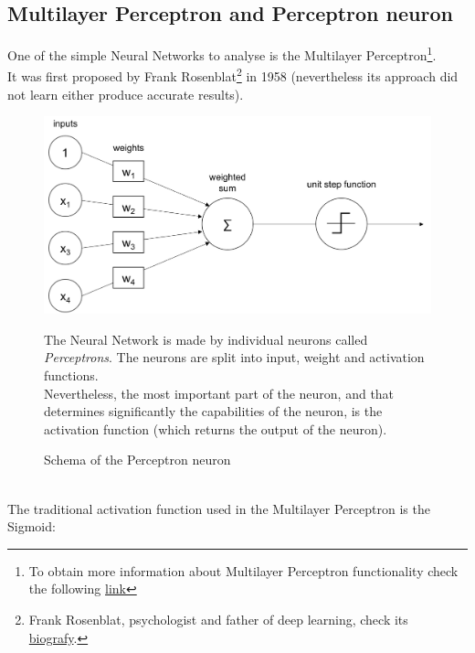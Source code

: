 \documentclass[a4paper, 11pt]{article}
\begin{document}
\subsection{Multilayer Perceptron and Perceptron neuron}
One of the simple Neural Networks to analyse is the Multilayer Perceptron\footnote{To obtain more information about Multilayer Perceptron functionality check the following \href{https://en.wikipedia.org/wiki/Multilayer_perceptron}{link}}.\\
It was first proposed by Frank Rosenblat\footnote{Frank Rosenblat, psychologist and father of deep learning, check its \href{https://en.wikipedia.org/wiki/Frank_Rosenblat}{biografy}.} in 1958 (nevertheless its approach did not learn either produce accurate results).
\begin{figure}[h]
    \begin{minipage}{9cm}
        \begin{center}
            \includegraphics[width = 1 \textwidth]{Neural_Network/perceptron_schema.png}
            \caption{Schema of the Perceptron neuron}
        \end{center} 
    \end{minipage}
    \hspace{1em}
    \begin{minipage}{5cm}
        The Neural Network is made by individual neurons called \textit{Perceptrons}. The neurons are split into input, weight and activation functions.\\
        Nevertheless, the most important part of the neuron, and that determines significantly the capabilities of the neuron, is the activation function (which returns the output of the neuron).
    \end{minipage}
\end{figure}\\
The traditional activation function used in the Multilayer Perceptron is the Sigmoid: 
\end{document}
